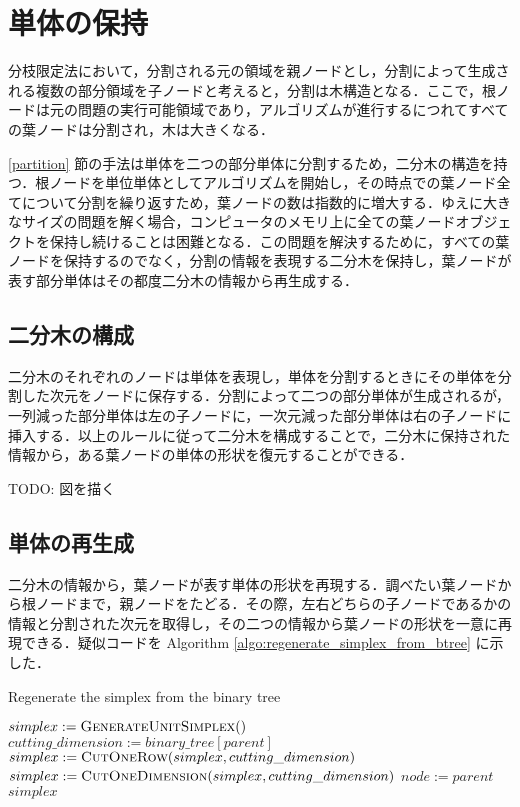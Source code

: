 \documentclass[a4paper,11pt]{jreport}
\begin{document}
\section{単体の保持}

分枝限定法において，分割される元の領域を親ノードとし，分割によって生成される複数の部分領域を子ノードと考えると，分割は木構造となる．ここで，根ノードは元の問題の実行可能領域であり，アルゴリズムが進行するにつれてすべての葉ノードは分割され，木は大きくなる．\par
\ref{partition} 節の手法は単体を二つの部分単体に分割するため，二分木の構造を持つ．根ノードを単位単体としてアルゴリズムを開始し，その時点での葉ノード全てについて分割を繰り返すため，葉ノードの数は指数的に増大する．ゆえに大きなサイズの問題を解く場合，コンピュータのメモリ上に全ての葉ノードオブジェクトを保持し続けることは困難となる．この問題を解決するために，すべての葉ノードを保持するのでなく，分割の情報を表現する二分木を保持し，葉ノードが表す部分単体はその都度二分木の情報から再生成する．\par

\subsection{二分木の構成}

二分木のそれぞれのノードは単体を表現し，単体を分割するときにその単体を分割した次元をノードに保存する．分割によって二つの部分単体が生成されるが，一列減った部分単体は左の子ノードに，一次元減った部分単体は右の子ノードに挿入する．以上のルールに従って二分木を構成することで，二分木に保持された情報から，ある葉ノードの単体の形状を復元することができる．\par
TODO: 図を描く\par

\subsection{単体の再生成}

二分木の情報から，葉ノードが表す単体の形状を再現する．調べたい葉ノードから根ノードまで，親ノードをたどる．その際，左右どちらの子ノードであるかの情報と分割された次元を取得し，その二つの情報から葉ノードの形状を一意に再現できる．疑似コードを Algorithm \ref{algo:regenerate_simplex_from_btree} に示した．\par

\begin{algorithm}
\caption{Regenerate the simplex from the binary tree}
\label{algo:regenerate_simplex_from_btree}
\begin{algorithmic}[1]
\State $ simplex := \Call{GenerateUnitSimplex} $
\State $ cutting\_dimension := binary\_tree[parent] $
\State $ simplex := \Call{CutOneRow}{simplex, cutting\_dimension} $
\State $ simplex := \Call{CutOneDimension}{simplex,  cutting\_dimension} $
\EndIf
\State $ node := parent $
\EndWhile
\State \Return $ simplex $
\EndFunction
\end{algorithmic}
\end{algorithm}
\end{document}
